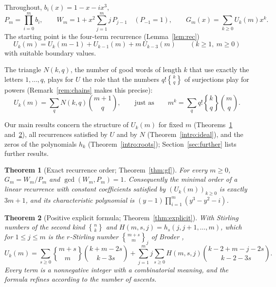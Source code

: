 \documentclass[11pt]{amsart}
\newtheorem{introthm}{Theorem}
\theoremstyle{definition}
\newcommand{\stirling}[2]{\genfrac{\{}{\}}{0pt}{}{#1}{#2}}
\newcommand{\rstirling}[3]{\genfrac{\{}{\}}{0pt}{}{#1}{#2}_{#3}}
\begin{document}
Throughout, $b_i(x)=1-x-ix^3$,
\[
  P_m=\prod_{i=0}^{m}b_i,\qquad W_m=1+x^2\sum_{j=1}^{m}j\,P_{j-1}\quad(P_{-1}=1),\qquad G_m(x)=\sum_{k\ge0}U_k(m)x^k .
\]
The starting point is the four-term recurrence (Lemma~\ref{lem:rec})
\begin{equation}\label{eq:rec}
  U_k(m)=U_k(m-1)+U_{k-1}(m)+m\,U_{k-3}(m)\qquad(k\ge1,\ m\ge0)
\end{equation}
with suitable boundary values.

The triangle $N(k,q)$, the number of good words of length $k$ that use exactly the letters $1,\dots,q$, plays for $U$ the role that the numbers $q!\stirling{k}{q}$ of surjections play for powers (Remark~\ref{rem:chains} makes this precise):
\[
  U_k(m)=\sum_q N(k,q)\binom{m+1}{q},\qquad\text{just as}\qquad m^k=\sum_q q!\stirling{k}{q}\binom{m}{q}.
\]

Our main results concern the structure of $U_k(m)$ for fixed $m$ (Theorems~\ref{intro:order} and~\ref{intro:explicit}), all recurrences satisfied by $U$ and by $N$ (Theorem~\ref{intro:ideal}), and the zeros of the polynomials $h_k$ (Theorem~\ref{intro:roots}); Section~\ref{sec:further} lists further results.

\begin{introthm}[Exact recurrence order; Theorem~\ref{thm:gf}]\label{intro:order}
For every $m\ge0$, $G_m=W_m/P_m$ and $\gcd(W_m,P_m)=1$. Consequently the minimal order of a linear recurrence with constant coefficients satisfied by $(U_k(m))_{k\ge0}$ is exactly $3m+1$, and its characteristic polynomial is $(y-1)\prod_{i=1}^{m}(y^3-y^2-i)$.
\end{introthm}

\begin{introthm}[Positive explicit formula; Theorem~\ref{thm:explicit}]\label{intro:explicit}
With Stirling numbers of the second kind $\stirling{n}{k}$ and $H(m,s,j)=h_s(j,j+1,\dots,m)$, which for $1\le j\le m$ is the $r$-Stirling number $\rstirling{m+s}{m}{j}$ of Broder \cite{Broder},
\[
  U_k(m)=\sum_{s\ge0}\stirling{m+s}{m}\binom{k+m-2s}{k-3s}+\sum_{j=1}^{m}j\sum_{s\ge0}H(m,s,j)\binom{k-2+m-j-2s}{k-2-3s}.
\]
Every term is a nonnegative integer with a combinatorial meaning, and the formula refines according to the number of ascents.
\end{introthm}
\end{document}
